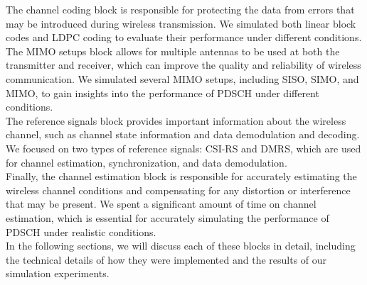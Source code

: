 The channel coding block is responsible for protecting the data from errors that may be introduced during wireless transmission. We simulated both linear block codes and LDPC coding to evaluate their performance under different conditions. \\
The MIMO setups block allows for multiple antennas to be used at both the transmitter and receiver, which can improve the quality and reliability of wireless communication. We simulated several MIMO setups, including SISO, SIMO, and MIMO, to gain insights into the performance of PDSCH under different conditions.\\
The reference signals block provides important information about the wireless channel, such as channel state information and data demodulation and decoding. We focused on two types of reference signals: CSI-RS and DMRS, which are used for channel estimation, synchronization, and data demodulation. \\

Finally, the channel estimation block is responsible for accurately estimating the wireless channel conditions and compensating for any distortion or interference that may be present. We spent a significant amount of time on channel estimation, which is essential for accurately simulating the performance of PDSCH under realistic conditions. \\
In the following sections, we will discuss each of these blocks in detail, including the technical details of how they were implemented and the results of our simulation experiments.
